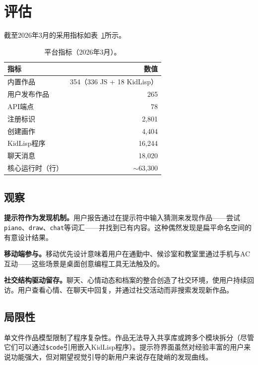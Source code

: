 \documentclass[10pt,letterpaper,twocolumn]{article}
\begin{document}

\section{评估}
\label{sec:evaluation}

截至2026年3月的采用指标如表~\ref{tab:adoption}所示。

\begin{table}[h]
\small
\centering
\begin{tabular}{lr}
\toprule
\textbf{指标} & \textbf{数值} \\
\midrule
内置作品 & 354（336 JS + 18 KidLisp） \\
用户发布作品 & 265 \\
API端点 & 78 \\
注册标识 & 2,801 \\
创建画作 & 4,404 \\
KidLisp程序 & 16,244 \\
聊天消息 & 18,020 \\
核心运行时（行） & $\sim$63,300 \\
\bottomrule
\end{tabular}
\caption{平台指标（2026年3月）。}
\label{tab:adoption}
\end{table}

\subsection{观察}

\textbf{提示符作为发现机制。}用户报告通过在提示符中输入猜测来发现作品——尝试\texttt{piano}、\texttt{draw}、\texttt{chat}等词汇——并找到已有内容。这种偶然发现是扁平命名空间的有意设计结果。

\textbf{移动端参与。}移动优先设计意味着用户在通勤中、候诊室和教室里通过手机与AC互动——这些场景是桌面创意编程工具无法触及的。

\textbf{社交结构驱动留存。}聊天、心情动态和档案的整合创造了社交环境，使用户持续回访。用户查看心情、在聊天中回复，并通过社交活动而非搜索发现新作品。

\subsection{局限性}

单文件作品模型限制了程序复杂性。作品无法导入共享库或跨多个模块拆分（尽管它们可以通过\texttt{\$code}引用嵌入KidLisp程序）。提示符界面虽然对经验丰富的用户来说功能强大，但对期望视觉引导的新用户来说存在陡峭的发现曲线。
\end{document}
